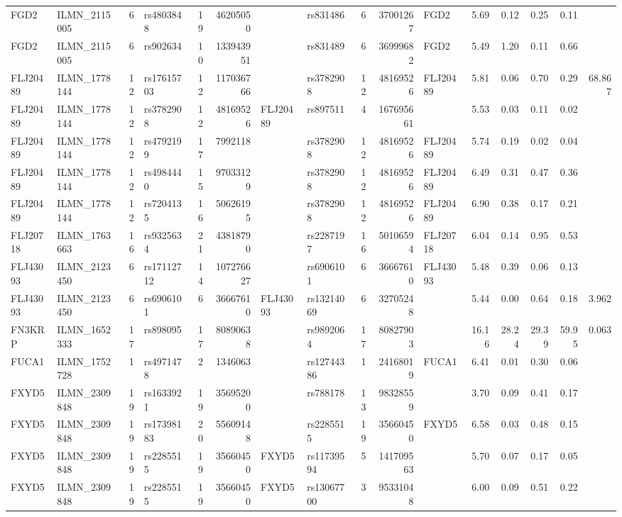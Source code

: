 \documentclass{article}
\begin{document}
\begin{landscape}
{\begin{ThreePartTable}
\begin{longtable}{|llr|lrrl|lrrl|rrrr|r|}
FGD2 & ILMN\_2115005 & 6 & rs4803848 & 19 & 46205050 &  & rs831486 & 6 & 37001267 & FGD2 & 5.69 & 0.12 & 0.25 & 0.11 &  \\
FGD2 & ILMN\_2115005 & 6 & rs902634 & 10 & 133943951 &  & rs831489 & 6 & 36999682 & FGD2 & 5.49 & 1.20 & 0.11 & 0.66 &  \\
FLJ20489 & ILMN\_1778144 & 12 & rs17615703 & 12 & 117036766 &  & rs3782908 & 12 & 48169526 & FLJ20489 & 5.81 & 0.06 & 0.70 & 0.29 & 68.867 \\
FLJ20489 & ILMN\_1778144 & 12 & rs3782908 & 12 & 48169526 & FLJ20489 & rs897511 & 4 & 167695661 &  & 5.53 & 0.03 & 0.11 & 0.02 &  \\
FLJ20489 & ILMN\_1778144 & 12 & rs4792199 & 17 & 7992118 &  & rs3782908 & 12 & 48169526 & FLJ20489 & 5.74 & 0.19 & 0.02 & 0.04 &  \\
FLJ20489 & ILMN\_1778144 & 12 & rs4984440 & 15 & 97033129 &  & rs3782908 & 12 & 48169526 & FLJ20489 & 6.49 & 0.31 & 0.47 & 0.36 &  \\
FLJ20489 & ILMN\_1778144 & 12 & rs7204135 & 16 & 50626195 &  & rs3782908 & 12 & 48169526 & FLJ20489 & 6.90 & 0.38 & 0.17 & 0.21 &  \\
FLJ20718 & ILMN\_1763663 & 16 & rs9325634 & 21 & 43818790 &  & rs2287197 & 16 & 50106594 & FLJ20718 & 6.04 & 0.14 & 0.95 & 0.53 &  \\
FLJ43093 & ILMN\_2123450 & 6 & rs17112712 & 14 & 107276627 &  & rs6906101 & 6 & 36667610 & FLJ43093 & 5.48 & 0.39 & 0.06 & 0.13 &  \\
FLJ43093 & ILMN\_2123450 & 6 & rs6906101 & 6 & 36667610 & FLJ43093 & rs13214069 & 6 & 32705248 &  & 5.44 & 0.00 & 0.64 & 0.18 & 3.962 \\
FN3KRP & ILMN\_1652333 & 17 & rs898095 & 17 & 80890638 &  & rs9892064 & 17 & 80827903 &  & 16.16 & 28.24 & 29.39 & 59.95 & 0.063 \\
FUCA1 & ILMN\_1752728 & 1 & rs4971478 & 2 & 1346063 &  & rs12744386 & 1 & 24168019 & FUCA1 & 6.41 & 0.01 & 0.30 & 0.06 &  \\
FXYD5 & ILMN\_2309848 & 19 & rs1633921 & 19 & 35695200 &  & rs788178 & 13 & 98328559 &  & 3.70 & 0.09 & 0.41 & 0.17 &  \\
FXYD5 & ILMN\_2309848 & 19 & rs17398183 & 20 & 55609148 &  & rs2285515 & 19 & 35660450 & FXYD5 & 6.58 & 0.03 & 0.48 & 0.15 &  \\
FXYD5 & ILMN\_2309848 & 19 & rs2285515 & 19 & 35660450 & FXYD5 & rs11739594 & 5 & 141709563 &  & 5.70 & 0.07 & 0.17 & 0.05 &  \\
FXYD5 & ILMN\_2309848 & 19 & rs2285515 & 19 & 35660450 & FXYD5 & rs13067700 & 3 & 95331048 &  & 6.00 & 0.09 & 0.51 & 0.22 &  \\

\end{longtable}
\end{ThreePartTable}}
\end{landscape}
\end{document}
